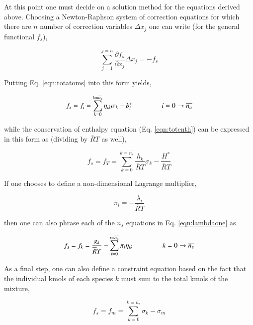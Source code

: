 	At this point one must decide on a solution method for the equations derived above.  Choosing
a Newton-Raphson system of correction equations for which there are $n$ number of correction 
variables $\Delta x_j$ one can write (for the general functional $f_s$),

\begin{equation}
	\sum_{j=1}^{j=n}\frac{\partial f_s}{\partial x_j}\Delta x_j = -f_s
\label{eqn:newtraph}
\end{equation}

	Putting Eq. \ref{eqn:totatoms} into this form yields,

\begin{equation}
	f_s = f_i = \sum_{k=0}^{k=\overline{n_s}}\eta_{ik}\sigma_k - b_i^* \hspace{15mm}i=0\rightarrow \overline{n_a}
\label{eqn:fi}
\end{equation}

	while the conservation of enthalpy equation (Eq. \ref{eqn:totenth}) can be expressed
in this form as (dividing by $\overline{R}T$ as well),

\begin{equation}
	f_s = f_T = \sum_{k=0}^{k=\overline{n_s}}\frac{h_k}{\overline{R}T}\sigma_k - \frac{H^*}
	{\overline{R}T}
\label{eqn:ft}
\end{equation}	

	If one chooses to define a non-dimensional Lagrange multiplier,

\begin{equation}
	\pi_i = -\frac{\lambda_i}{\overline{R}T}
\label{eqn:lagrange}
\end{equation}

	then one can also phrase each of the $\overline{n_s}$ equations in Eq. \ref{eqn:lambdaone} as

\begin{equation}
	f_s = f_k = \frac{g_k}{\overline{R}T} - \sum_{i=0}^{i=\overline{n_a}}\pi_i\eta_{ik}
	\hspace{15mm}k=0\rightarrow \overline{n_s}
\label{eqn:fk}
\end{equation}

	As a final step, one can also define a constraint equation based on the fact that
the individual kmols of each species $k$ must sum to the total kmols of the mixture,

\begin{equation}
	f_s = f_m = \sum_{k=0}^{k=\overline{n_s}}\sigma_k - \sigma_m
\label{eqn:fm}
\end{equation}

